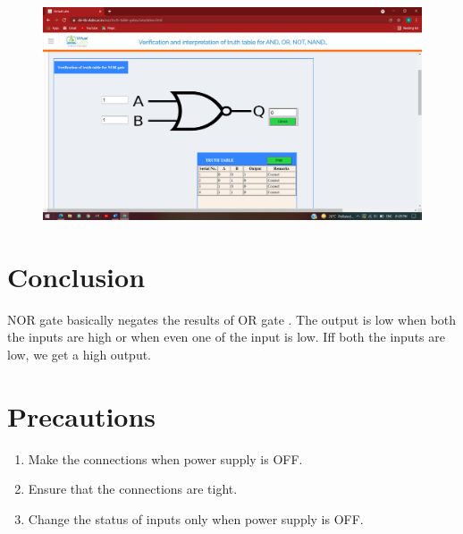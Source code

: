 		\begin{figure}[h]
		\centering
		\includegraphics[width=0.9\linewidth]{img/exp5/7}
		\caption{}
		\label{fig:5:7}
	\end{figure}

\section{Conclusion}
NOR gate basically negates the results of OR gate . The output is low when both the inputs are high or when even one of the input is low. Iff both the inputs are low, we get a high output.

\section{Precautions}
	\begin{enumerate}
		\tightlist
		\item Make the connections when power supply is OFF.
		\item Ensure that the connections are tight.
		\item Change the status of inputs only when power supply is OFF.
	\end{enumerate}
